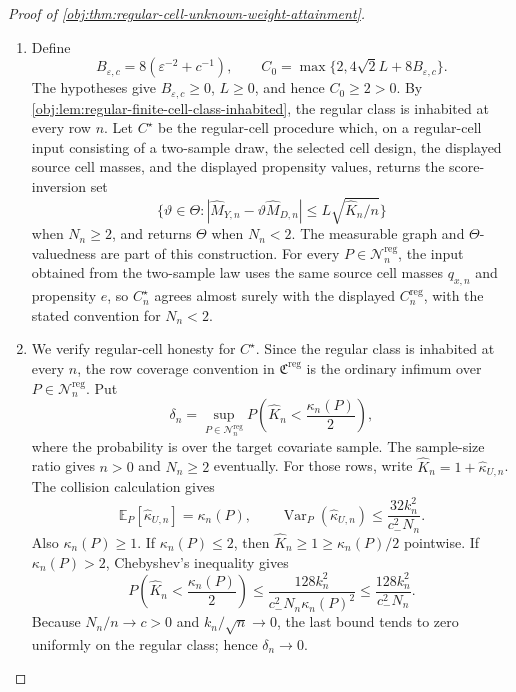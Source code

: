 \documentclass[11pt]{article}
\begin{document}
\begin{proof}[Proof of \cref{obj:thm:regular-cell-unknown-weight-attainment}]
\begin{enumerate}
\item Define
\[
B_{\varepsilon,c}=8(\varepsilon^{-2}+c^{-1}),\qquad
C_0=\max\{2,4\sqrt2L+8B_{\varepsilon,c}\}.
\]
The hypotheses give \(B_{\varepsilon,c}\ge0\), \(L\ge0\), and hence \(C_0\ge2>0\). By \cref{obj:lem:regular-finite-cell-class-inhabited}, the regular class is inhabited at every row \(n\). Let \(C^\star\) be the regular-cell procedure which, on a regular-cell input consisting of a two-sample draw, the selected cell design, the displayed source cell masses, and the displayed propensity values, returns the score-inversion set
\[
\{\vartheta\in\Theta:
|\widehat M_{Y,n}-\vartheta\widehat M_{D,n}|
\le L\sqrt{\widehat K_n/n}\}
\]
when \(N_n\ge2\), and returns \(\Theta\) when \(N_n<2\). The measurable graph and \(\Theta\)-valuedness are part of this construction. For every \(P\in\mathcal N_n^{\mathrm{reg}}\), the input obtained from the two-sample law uses the same source cell masses \(q_{x,n}\) and propensity \(e\), so \(C^\star_n\) agrees almost surely with the displayed \(C_n^{\mathrm{reg}}\), with the stated convention for \(N_n<2\). %

\item We verify regular-cell honesty for \(C^\star\). Since the regular class is inhabited at every \(n\), the row coverage convention in \(\mathfrak C^{\mathrm{reg}}\) is the ordinary infimum over \(P\in\mathcal N_n^{\mathrm{reg}}\). Put
\[
\delta_n=\sup_{P\in\mathcal N_n^{\mathrm{reg}}}
P\!\left(\widehat K_n<\frac{\kappa_n(P)}2\right),
\]
where the probability is over the target covariate sample. The sample-size ratio gives \(n>0\) and \(N_n\ge2\) eventually. For those rows, write \(\widehat K_n=1+\widehat\kappa_{U,n}\). The collision calculation gives
\[
\mathbb E_P[\widehat\kappa_{U,n}]=\kappa_n(P),\qquad
\operatorname{Var}_P(\widehat\kappa_{U,n})
\le \frac{32k_n^2}{c_-^2N_n}.
\]
Also \(\kappa_n(P)\ge1\). If \(\kappa_n(P)\le2\), then \(\widehat K_n\ge1\ge\kappa_n(P)/2\) pointwise. If \(\kappa_n(P)>2\), Chebyshev's inequality gives
\[
P\!\left(\widehat K_n<\frac{\kappa_n(P)}2\right)
\le
\frac{128k_n^2}{c_-^2N_n\kappa_n(P)^2}
\le
\frac{128k_n^2}{c_-^2N_n}.
\]
Because \(N_n/n\to c>0\) and \(k_n/\sqrt n\to0\), the last bound tends to zero uniformly on the regular class; hence \(\delta_n\to0\).


\end{enumerate}
\end{proof}
\end{document}
